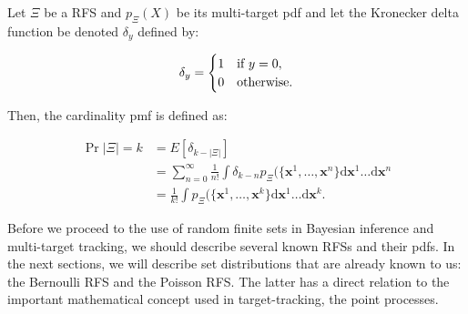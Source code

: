 \begin{definition}\label{def:cardinality-rfs}
    Let $\Xi$ be a RFS and $p_\Xi(X)$ be its multi-target pdf and let the Kronecker delta function be denoted $\delta_y$ defined by:

    \begin{equation}
        \delta_y = \begin{cases}
            1 & \textup{if } y = 0, \\
            0 & \textup{otherwise}.
        \end{cases}
    \end{equation}
    
    Then, the cardinality pmf is defined as:

    \begin{align}
        \Pr{|\Xi| = k}
        &= E[\delta_{k - |\Xi|}] \\
        &= \sum_{n=0}^\infty \frac{1}{n !}
        \int \delta_{k - n}
        p_\Xi(\{\mathbf{x}^1, \ldots, \mathbf{x}^n\}
        \mathrm{d}\mathbf{x}^1 \ldots \mathrm{d}\mathbf{x}^n \\
        &= \frac{1}{k !}
        \int p_\Xi(\{\mathbf{x}^1, \ldots, \mathbf{x}^k\}
        \mathrm{d}\mathbf{x}^1 \ldots \mathrm{d}\mathbf{x}^k.
    \end{align}
\end{definition}

Before we proceed to the use of random finite sets in Bayesian inference and multi-target tracking, we should describe several known RFSs and their pdfs. In the next sections, we will describe set distributions that are already known to us: the Bernoulli RFS and the Poisson RFS. The latter has a direct relation to the important mathematical concept used in target-tracking, the point processes.
